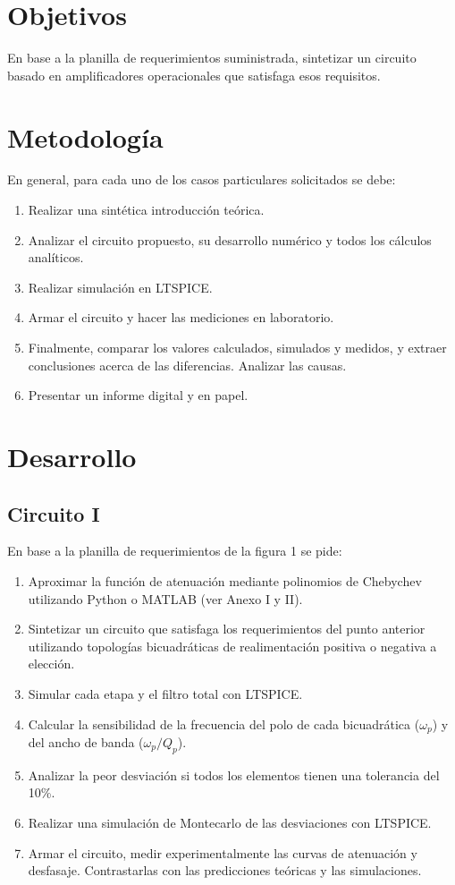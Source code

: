 \newpage
\section*{Objetivos}
En base a la planilla de requerimientos suministrada, sintetizar un circuito basado en amplificadores operacionales que satisfaga esos requisitos.

\section*{Metodología}
En general, para cada uno de los casos particulares solicitados se debe:
\begin{enumerate}
    \item Realizar una sintética introducción teórica.
    \item Analizar el circuito propuesto, su desarrollo numérico y todos los cálculos analíticos.
    \item Realizar simulación en LTSPICE.
    \item Armar el circuito y hacer las mediciones en laboratorio.
    \item Finalmente, comparar los valores calculados, simulados y medidos, y extraer conclusiones acerca de las diferencias. Analizar las causas.
    \item Presentar un informe digital y en papel.
\end{enumerate}

\section*{Desarrollo}

\subsection*{Circuito I}
En base a la planilla de requerimientos de la figura 1 se pide:
\begin{enumerate}
    \item Aproximar la función de atenuación mediante polinomios de Chebychev utilizando Python o MATLAB (ver Anexo I y II).
    \item Sintetizar un circuito que satisfaga los requerimientos del punto anterior utilizando topologías bicuadráticas de realimentación positiva o negativa a elección.
    \item Simular cada etapa y el filtro total con LTSPICE.
    \item Calcular la sensibilidad de la frecuencia del polo de cada bicuadrática (\(\omega_p\)) y del ancho de banda (\(\omega_p / Q_p\)).
    \item Analizar la peor desviación si todos los elementos tienen una tolerancia del 10\%.
    \item Realizar una simulación de Montecarlo de las desviaciones con LTSPICE.
    \item Armar el circuito, medir experimentalmente las curvas de atenuación y desfasaje. Contrastarlas con las predicciones teóricas y las simulaciones.
\end{enumerate}

